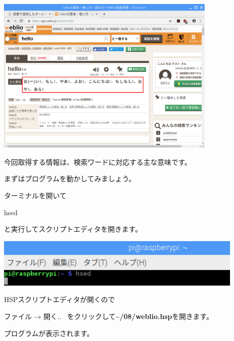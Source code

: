 \begin{center}
\includegraphics[width=0.8\textwidth]{./text08-img/textbook-img046.png}

\end{center}
今回取得する情報は、検索ワードに対応する主な意味です。

まずはプログラムを動かしてみましょう。

ターミナルを開いて

hsed

と実行してスクリプトエディタを開きます。



\begin{center}
\includegraphics[width=0.9\textwidth]{./text08-img/textbook-img013.png}

\end{center}
\clearpage
HSPスクリプトエディタが開くので

ファイル → 開く..
\ をクリックして\textbf{{\textasciitilde}/08/weblio.hsp}を開きます。

プログラムが表示されます。




